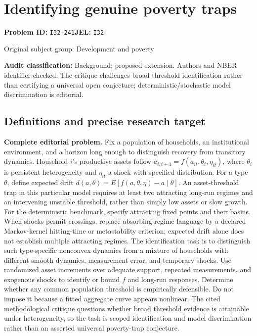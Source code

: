\documentclass[11pt,a4paper]{article}
\begin{document}
\section*{Identifying genuine poverty traps}
\textbf{Problem ID:} \texttt{I32-241}\quad \textbf{JEL:} \texttt{I32}\par
\label{problem:OP-0370}
{\sffamily\small\color{muted}Original subject group: Development and poverty\par}
\label{definitions:problem:30007652}
\textbf{Audit classification:} Background; proposed extension. Authors and NBER identifier checked. The critique challenges broad threshold identification rather than certifying a universal open conjecture; deterministic/stochastic model discrimination is editorial.
\subsection*{Definitions and precise research target}
\textbf{Complete editorial problem.} Fix a population of households, an institutional environment, and a horizon long enough to distinguish recovery from transitory dynamics. Household \(i\)'s productive assets follow \(a_{i,t+1}=f(a_{it},\theta_i,\eta_{it})\), where \(\theta_i\) is persistent heterogeneity and \(\eta_{it}\) a shock with specified distribution. For a type \(\theta\), define expected drift \(d(a,\theta)=E[f(a,\theta,\eta)-a\mid\theta]\). An asset-threshold trap in this particular model requires at least two attracting long-run regimes and an intervening unstable threshold, rather than simply low assets or slow growth. For the deterministic benchmark, specify attracting fixed points and their basins. When shocks permit crossings, replace absorbing-regime language by a declared Markov-kernel hitting-time or metastability criterion; expected drift alone does not establish multiple attracting regimes. The identification task is to distinguish such type-specific nonconvex dynamics from a mixture of households with different smooth dynamics, measurement error, and temporary shocks. Use randomized asset increments over adequate support, repeated measurements, and exogenous shocks to identify or bound \(f\) and long-run responses. Determine whether any common population threshold is empirically defensible. Do not impose it because a fitted aggregate curve appears nonlinear. The cited methodological critique questions whether broad threshold evidence is attainable under heterogeneity, so the task is scoped identification and model discrimination rather than an asserted universal poverty-trap conjecture.
\end{document}
